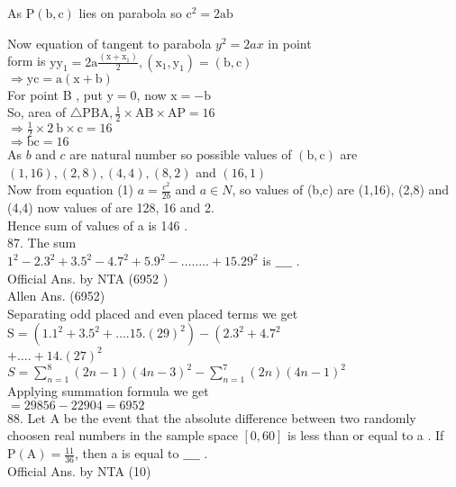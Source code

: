\documentclass[10pt]{article}
\begin{document}
As \(\mathrm{P}(\mathrm{b}, \mathrm{c})\) lies on parabola so \(\mathrm{c}^{2}=2 \mathrm{ab}\)

Now equation of tangent to parabola \(y^{2}=2 a x\) in point\\
form is \(\mathrm{yy}_{1}=2 \mathrm{a} \frac{\left(\mathrm{x}+\mathrm{x}_{1}\right)}{2},\left(\mathrm{x}_{1}, \mathrm{y}_{1}\right)=(\mathrm{b}, \mathrm{c})\)\\
\(\Rightarrow \mathrm{yc}=\mathrm{a}(\mathrm{x}+\mathrm{b})\)\\
For point B , put \(\mathrm{y}=0\), now \(\mathrm{x}=-\mathrm{b}\)\\
So, area of \(\triangle \mathrm{PBA}, \frac{1}{2} \times \mathrm{AB} \times \mathrm{AP}=16\)\\
\(\Rightarrow \frac{1}{2} \times 2 \mathrm{~b} \times \mathrm{c}=16\)\\
\(\Rightarrow \mathrm{bc}=16\)\\
As \(b\) and \(c\) are natural number so possible values of \((\mathrm{b}, \mathrm{c})\) are \((1,16),(2,8),(4,4),(8,2)\) and \((16,1)\)\\
Now from equation (1) \(a=\frac{c^{2}}{2 b}\) and \(a \in N\), so values of (b,c) are (1,16), (2,8) and (4,4) now values of are 128, 16 and 2.\\
Hence sum of values of a is 146 .\\
87. The sum\\
\(1^{2}-2.3^{2}+3.5^{2}-4.7^{2}+5.9^{2}-\ldots \ldots . .+15.29^{2}\) is \(\_\_\_\_\) .\\
Official Ans. by NTA (6952 )\\
Allen Ans. (6952)\\
Separating odd placed and even placed terms we get\\
\(\mathrm{S}=\left(1.1^{2}+3.5^{2}+\ldots .15 .(29)^{2}\right)-\left(2.3^{2}+4.7^{2}\right.\)\\
\(+\ldots .+14 .(27)^{2}\)\\
\(S=\sum_{n=1}^{8}(2 n-1)(4 n-3)^{2}-\sum_{n=1}^{7}(2 n)(4 n-1)^{2}\)\\
Applying summation formula we get\\
\(=29856-22904=6952\)\\
88. Let A be the event that the absolute difference between two randomly choosen real numbers in the sample space \([0,60]\) is less than or equal to a . If \(\mathrm{P}(\mathrm{A})=\frac{11}{36}\), then a is equal to \(\_\_\_\_\) .\\
Official Ans. by NTA (10)\\
\end{document}
